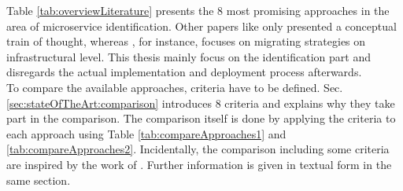 \noindent
Table \ref{tab:overviewLiterature} presents the 8 most promising approaches in the area of microservice identification. Other papers like \cite{TowardsCloudGuiseppe} only presented a conceptual train of thought, whereas \cite{MigratingCloud}, for instance, focuses on migrating strategies on infrastructural level. This thesis mainly focus on the identification part and disregards the actual implementation and deployment process afterwards. \\
To compare the available approaches, criteria have to be defined. Sec.\ref{sec:stateOfTheArt:comparison} introduces 8 criteria and explains why they take part in the comparison. The comparison itself is done by applying the criteria to each approach using Table \ref{tab:compareApproaches1} and \ref{tab:compareApproaches2}. Incidentally, the comparison including some criteria are inspired by the work of \cite{ClassificationOfRefactoring}.
Further information is given in textual form in the same section. 







